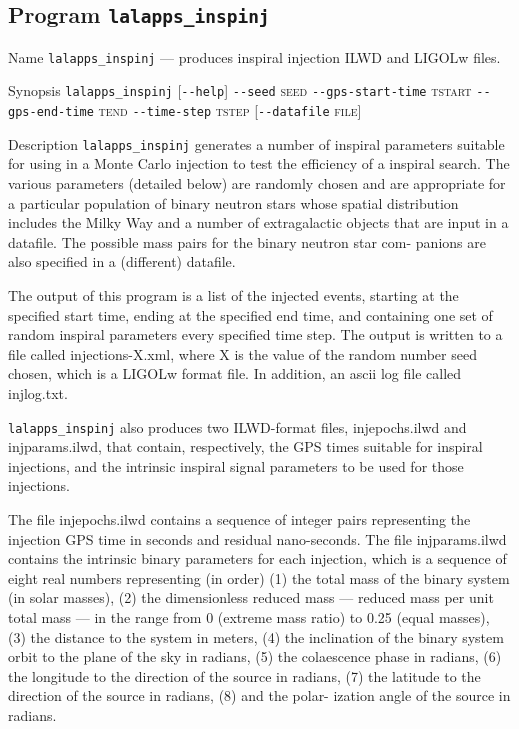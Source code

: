 \clearpage
\subsection{Program \texttt{lalapps\_inspinj}}
\label{program:lalapps-inspinj}

\begin{entry}
\item[Name]
\verb$lalapps_inspinj$ --- produces inspiral injection ILWD and LIGOLw files.

\item[Synopsis]
\verb$lalapps_inspinj$ 
[\verb$--help$]
\verb$--seed$ \textsc{seed}
\verb$--gps-start-time$ \textsc{tstart} 
\verb$--gps-end-time$ \textsc{tend} 
\verb$--time-step$ \textsc{tstep} 
[\verb$--datafile$ \textsc{file}]

\item[Description] 
\verb$lalapps_inspinj$
generates a number of inspiral  parameters suitable  for using in a Monte Carlo
injection to test the efficiency of a inspiral search.  The  various
parameters (detailed  below)  are randomly chosen and are appropriate for a
particular population of binary neutron stars  whose spatial  distribution
includes the Milky Way and a number of extragalactic objects that are  input
in  a  datafile.  The  possible  mass pairs for the binary neutron star com-
panions are also specified in a (different) datafile.

The output of this program  is  a  list  of  the  injected events,  starting
at  the specified start time, ending at the specified end time, and containing
one set  of  random inspiral parameters every specified time step.  The output
is written to a file called injections-X.xml, where  X  is the  value  of  the
random number seed chosen, which is a LIGOLw format file.  In addition, an
ascii log file called injlog.txt.

\verb+lalapps_inspinj+ also produces two ILWD-format files, injepochs.ilwd and
injparams.ilwd, that contain, respectively, the  GPS  times  suitable for
inspiral injections, and the intrinsic inspiral signal parameters to be used
for  those injections.

The  file  injepochs.ilwd  contains  a sequence of integer pairs representing
the injection GPS time in  seconds  and residual  nano-seconds.   The file
injparams.ilwd contains the intrinsic binary parameters for each injection,
which is  a  sequence  of  eight  real  numbers representing (in order) (1) the
total mass of the binary system  (in  solar masses),  (2)  the  dimensionless
reduced mass --- reduced mass per unit total mass --- in the range from  0
(extreme mass  ratio)  to  0.25 (equal masses), (3) the distance to the system
in meters, (4) the inclination  of  the  binary system  orbit  to the plane of
the sky in radians, (5) the colaescence phase in radians, (6)  the  longitude
to  the direction  of  the  source in radians, (7) the latitude to the
direction of the source in radians, (8) and the polar- ization angle of the
source in radians.



\end{entry}
